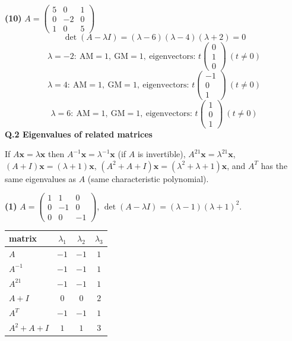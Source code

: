 \noindent\textbf{(10)} $A=\begin{pmatrix}5 & 0 & 1 \\ 0 & -2 & 0 \\ 1 & 0 & 5\end{pmatrix}$
\[ \det(A-\lambda I)=\left(\lambda - 6\right) \left(\lambda - 4\right) \left(\lambda + 2\right)=0 \]
\[ \lambda=-2:\ \text{AM}=1,\ \text{GM}=1,\ \text{eigenvectors: }t\begin{pmatrix}0 \\ 1 \\ 0\end{pmatrix}\ (t\neq0) \]
\[ \lambda=4:\ \text{AM}=1,\ \text{GM}=1,\ \text{eigenvectors: }t\begin{pmatrix}-1 \\ 0 \\ 1\end{pmatrix}\ (t\neq0) \]
\[ \lambda=6:\ \text{AM}=1,\ \text{GM}=1,\ \text{eigenvectors: }t\begin{pmatrix}1 \\ 0 \\ 1\end{pmatrix}\ (t\neq0) \]
\medskip\noindent\textbf{Q.2  Eigenvalues of related matrices}\par\smallskip
If $A\mathbf x=\lambda\mathbf x$ then $A^{-1}\mathbf x=\lambda^{-1}\mathbf x$ (if $A$ is invertible), $A^{21}\mathbf x=\lambda^{21}\mathbf x$, $(A+I)\mathbf x=(\lambda+1)\mathbf x$, $(A^2+A+I)\mathbf x=(\lambda^2+\lambda+1)\mathbf x$, and $A^T$ has the same eigenvalues as $A$ (same characteristic polynomial).

\noindent\textbf{(1)} $A=\begin{pmatrix}1 & 1 & 0 \\ 0 & -1 & 0 \\ 0 & 0 & -1\end{pmatrix}$, $\det(A-\lambda I)=\left(\lambda - 1\right) \left(\lambda + 1\right)^{2}$.
\begin{center}\begin{tabular}{l|ccc}
 matrix & $\lambda_1$ & $\lambda_2$ & $\lambda_3$ \\ \hline
$A$ & $-1$ & $-1$ & $1$ \\
$A^{-1}$ & $-1$ & $-1$ & $1$ \\
$A^{21}$ & $-1$ & $-1$ & $1$ \\
$A+I$ & $0$ & $0$ & $2$ \\
$A^T$ & $-1$ & $-1$ & $1$ \\
$A^2+A+I$ & $1$ & $1$ & $3$ \\
\end{tabular}\end{center}

